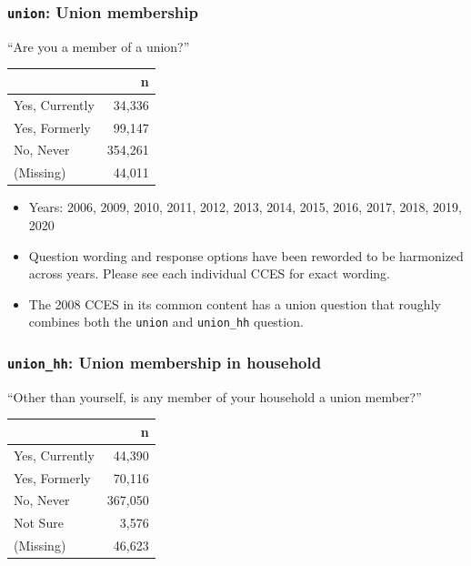 \documentclass[10pt,article,oneside]{memoir}
\theoremstyle{definition}
\begin{document}
\hypertarget{union-union-membership}{%
\subsubsection{\texorpdfstring{\texttt{union}: Union
membership}{union: Union membership}}\label{union-union-membership}}

``Are you a member of a union?''

\begin{table}[H]
\centering
\begin{tabular}{lr}
\toprule
 & n\\
\midrule
Yes, Currently & 34,336\\
Yes, Formerly & 99,147\\
No, Never & 354,261\\
(Missing) & 44,011\\
\bottomrule
\end{tabular}
\end{table}

\begin{itemize}
\tightlist
\item
  Years: 2006, 2009, 2010, 2011, 2012, 2013, 2014, 2015, 2016, 2017,
  2018, 2019, 2020
\item
  Question wording and response options have been reworded to be
  harmonized across years. Please see each individual CCES for exact
  wording.
\item
  The 2008 CCES in its common content has a union question that roughly
  combines both the \texttt{union} and \texttt{union\_hh} question.
\end{itemize}

\hypertarget{union_hh-union-membership-in-household}{%
\subsubsection{\texorpdfstring{\texttt{union\_hh}: Union membership in
household}{union\_hh: Union membership in household}}\label{union_hh-union-membership-in-household}}

``Other than yourself, is any member of your household a union member?''

\begin{table}[H]
\centering
\begin{tabular}{lr}
\toprule
 & n\\
\midrule
Yes, Currently & 44,390\\
Yes, Formerly & 70,116\\
No, Never & 367,050\\
Not Sure & 3,576\\
(Missing) & 46,623\\
\bottomrule
\end{tabular}
\end{table}
\end{document}
